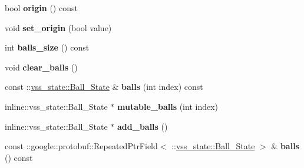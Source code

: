 \begin{DoxyCompactItemize}
\item 
bool {\bfseries origin} () const \hypertarget{classvss__state_1_1Global__State_a5b09a31922fe8f976a7e21f2279a1364}{}\label{classvss__state_1_1Global__State_a5b09a31922fe8f976a7e21f2279a1364}

\item 
void {\bfseries set\+\_\+origin} (bool value)\hypertarget{classvss__state_1_1Global__State_ac88223b795690cc57a71f24b315352fc}{}\label{classvss__state_1_1Global__State_ac88223b795690cc57a71f24b315352fc}

\item 
int {\bfseries balls\+\_\+size} () const \hypertarget{classvss__state_1_1Global__State_a5010e0f86563f07ce75ed2138de96ae5}{}\label{classvss__state_1_1Global__State_a5010e0f86563f07ce75ed2138de96ae5}

\item 
void {\bfseries clear\+\_\+balls} ()\hypertarget{classvss__state_1_1Global__State_a738a0947e2c3a450614579e1b7c008e4}{}\label{classvss__state_1_1Global__State_a738a0947e2c3a450614579e1b7c008e4}

\item 
const \+::\hyperlink{classvss__state_1_1Ball__State}{vss\+\_\+state\+::\+Ball\+\_\+\+State} \& {\bfseries balls} (int index) const \hypertarget{classvss__state_1_1Global__State_a6177a6bdab45c96d10c9f64371cd12af}{}\label{classvss__state_1_1Global__State_a6177a6bdab45c96d10c9f64371cd12af}

\item 
inline\+::vss\+\_\+state\+::\+Ball\+\_\+\+State $\ast$ {\bfseries mutable\+\_\+balls} (int index)\hypertarget{classvss__state_1_1Global__State_a88e1c23a1561e6edeaa2c835ad5eb358}{}\label{classvss__state_1_1Global__State_a88e1c23a1561e6edeaa2c835ad5eb358}

\item 
inline\+::vss\+\_\+state\+::\+Ball\+\_\+\+State $\ast$ {\bfseries add\+\_\+balls} ()\hypertarget{classvss__state_1_1Global__State_aa02eca734a92c0f8352fc57dbda91e4e}{}\label{classvss__state_1_1Global__State_aa02eca734a92c0f8352fc57dbda91e4e}

\item 
const \+::google\+::protobuf\+::\+Repeated\+Ptr\+Field$<$ \+::\hyperlink{classvss__state_1_1Ball__State}{vss\+\_\+state\+::\+Ball\+\_\+\+State} $>$ \& {\bfseries balls} () const \hypertarget{classvss__state_1_1Global__State_a792da3990e724f225e585f3e099eab3c}{}\label{classvss__state_1_1Global__State_a792da3990e724f225e585f3e099eab3c}


\end{DoxyCompactItemize}
